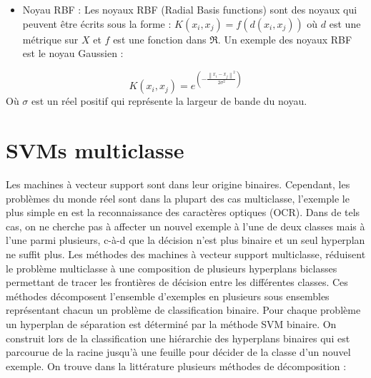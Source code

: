 \documentclass[12pt,a4paper]{report}
\begin{document}
\begin{itemize}
	\item Noyau RBF : Les noyaux RBF (Radial Basis functions) sont des noyaux qui peuvent être écrits sous la forme : $K\left(x_{i}, x_{j}\right)=f\left(d\left(x_{i}, x_{j}\right)\right)$ où $d$ est une métrique sur $X$ et $f$ est une fonction dans $\Re$. Un exemple des noyaux RBF est le noyau Gaussien :
\end{itemize}
$$
K\left(x_{i}, x_{j}\right)=e^{\left(-\frac{\left\|x_{i}-x_{j}\right\|^{2}}{2 \sigma^{2}}\right)}
$$
Où $\sigma$ est un réel positif qui représente la largeur de bande du noyau.

	\chapter{SVMs multiclasse }
Les machines à vecteur support sont dans leur origine binaires. Cependant, les problèmes
du monde réel sont dans la plupart des cas multiclasse, l’exemple le plus simple en
est la reconnaissance des caractères optiques (OCR). Dans de tels cas, on ne cherche pas à
affecter un nouvel exemple à l’une de deux classes mais à l’une parmi plusieurs, c-à-d que
la décision n’est plus binaire et un seul hyperplan ne suffit plus.
Les méthodes des machines à vecteur support multiclasse, réduisent le problème multiclasse à une composition de plusieurs hyperplans biclasses permettant de tracer les
frontières de décision entre les différentes classes. Ces méthodes décomposent l’ensemble
d’exemples en plusieurs sous ensembles représentant chacun un problème de classification
binaire. Pour chaque problème un hyperplan de séparation est déterminé par la méthode
SVM binaire. On construit lors de la classification une hiérarchie des hyperplans binaires
qui est parcourue de la racine jusqu’à une feuille pour décider de la classe d’un nouvel
exemple. On trouve dans la littérature plusieurs méthodes de décomposition :
\end{document}
